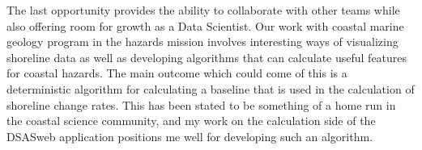 \documentclass{article}
\begin{document}
The last opportunity provides the ability to collaborate with other teams while also offering room for growth as a Data Scientist.
Our work with coastal marine geology program in the hazards mission involves interesting ways of visualizing shoreline data as well as developing algorithms that can calculate useful features for coastal hazards.
The main outcome which could come of this is a deterministic algorithm for calculating a baseline that is used in the calculation of shoreline change rates.
This has been stated to be something of a home run in the coastal science community, and my work on the calculation side of the DSASweb application positions me well for developing such an algorithm.
\end{document}
